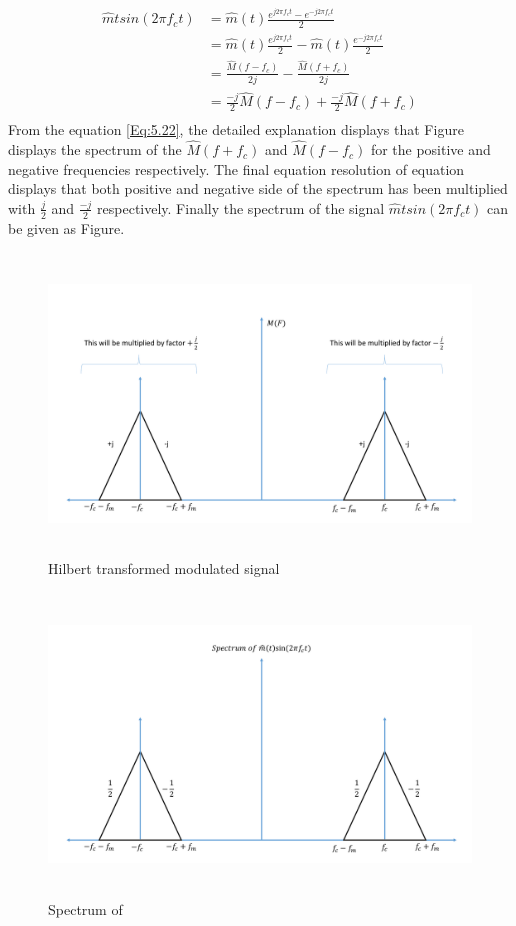 \begin{equation}
\begin{split}
{\hat{m}t} sin(2\pi f_c t)&={\hat{m}(t)}\frac{e^{j2\pi f_c t} - e^{-j2\pi f_c t} }{2}\\
&={\hat{m}(t)}\frac{e^{j2\pi f_c t}}{2} - {\hat{m}(t)}\frac{e^{-j2\pi f_c t}}{2}\\
&={\frac{\hat{M}(f-f_c)}{2j}}-{\frac{\hat{M}(f+f_c)}{2j}}\\
&={\frac{-j}{2}\hat{M}(f-f_c)}+{\frac{-j}{2}\hat{M}(f+f_c)}\\
\end{split}
\label{5.22}
\end{equation}
From the equation \ref{Eq:5.22}, the detailed explanation displays that Figure displays the spectrum of the $\hat{M}(f+f_c)$ and $\hat{M}(f-f_c)$ for the positive and negative frequencies respectively. The final equation resolution of equation displays that both positive and negative side of the spectrum has been multiplied with $\frac{j}{2}$ and $\frac{-j}{2}$ respectively. Finally the spectrum of the signal ${\hat{m}t} sin(2\pi f_c t)$ can be given as Figure.
\begin{figure}[h]
	\centering
	\includegraphics[width=1.0\textwidth, height=8cm]{./sdf/simplified_coherent_receiver/figures/SSB4.pdf}
	\caption{Hilbert transformed modulated signal}\label{Hilbert_Transformed_modulated_signal}
\end{figure}

\begin{figure}[h]
	\centering
	\includegraphics[width=1.0\textwidth, height=8cm]{./sdf/simplified_coherent_receiver/figures/SSB5.pdf}
	\caption{Spectrum of}\label{xxx}
\end{figure}

